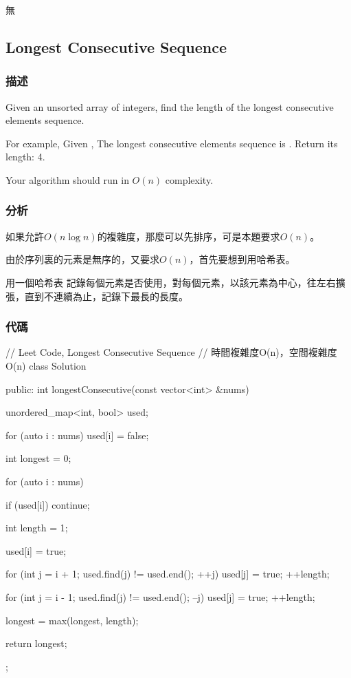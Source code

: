 \begindot
\item 無
\myenddot


\subsection{Longest Consecutive Sequence} %
\label{sec:longest-consecutive-sequence}


\subsubsection{描述}
Given an unsorted array of integers, find the length of the longest consecutive elements sequence.

For example,
Given \code{\[100, 4, 200, 1, 3, 2\]},
The longest consecutive elements sequence is \code{\[1, 2, 3, 4\]}. Return its length: 4.

Your algorithm should run in $O(n)$ complexity.


\subsubsection{分析}
如果允許$O(n \log n)$的複雜度，那麼可以先排序，可是本題要求$O(n)$。

由於序列裏的元素是無序的，又要求$O(n)$，首先要想到用哈希表。

用一個哈希表 記錄每個元素是否使用，對每個元素，以該元素為中心，往左右擴張，直到不連續為止，記錄下最長的長度。


\subsubsection{代碼}
\begin{Code}
// Leet Code, Longest Consecutive Sequence
// 時間複雜度O(n)，空間複雜度O(n)
class Solution {
public:
    int longestConsecutive(const vector<int> &nums) {
        unordered_map<int, bool> used;

        for (auto i : nums) used[i] = false;

        int longest = 0;

        for (auto i : nums) {
            if (used[i]) continue;

            int length = 1;

            used[i] = true;

            for (int j = i + 1; used.find(j) != used.end(); ++j) {
                used[j] = true;
                ++length;
            }

            for (int j = i - 1; used.find(j) != used.end(); --j) {
                used[j] = true;
                ++length;
            }

            longest = max(longest, length);
        }

        return longest;
    }
};
\end{Code}

